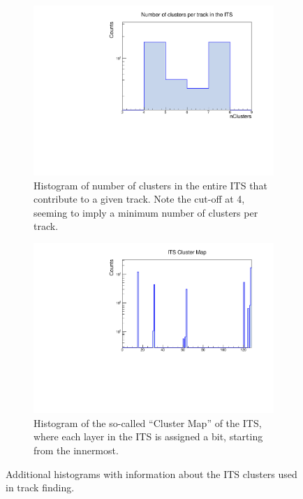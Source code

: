 \begin{figure}[H]%
    \centering
    \begin{subfigure}[t]{.49\linewidth}
        \centering
        \includegraphics[width=\linewidth]{Plots/pass4_TracksIU/itsNCls.pdf}
        \caption{Histogram of number of clusters in the entire ITS that contribute to a given track. Note the cut-off at 4, seeming to imply a minimum number of clusters per track.}
        \label{fig:ITS_NCls}
    \end{subfigure}
    \hfill
    \begin{subfigure}[t]{.49\linewidth}
        \centering
        \includegraphics[width=\linewidth]{Plots/pass4_TracksIU/itsClusterMap.pdf}
        \caption{Histogram of the so-called ``Cluster Map'' of the ITS, where each layer in the ITS is assigned a bit, starting from the innermost.}
        \label{fig:ITS_ClusterMap}
    \end{subfigure}
\caption[Histograms of cluster information for tracks in the ITS]{Additional histograms with information about the ITS clusters used in track finding.}
\label{fig:ITS_Clusters}
\end{figure}